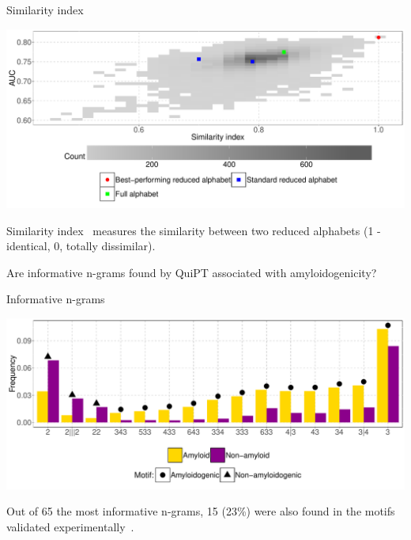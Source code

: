 \documentclass{beamer}\usepackage[]{graphicx}\usepackage[]{color}
\makeatletter
\def\maxwidth{ %
  \ifdim\Gin@nat@width>\linewidth
    \linewidth
  \else
    \Gin@nat@width
  \fi
}
\newenvironment{knitrout}{}{} %
\makeatother
\begin{document}
\begin{frame}{Similarity index}
\begin{knitrout}
\color{fgcolor}

{\centering \includegraphics[width=\maxwidth]{figure/unnamed-chunk-3-1} 

}



\end{knitrout}
Similarity index~\citep{stephenson_unearthing_2013} measures the similarity between two reduced alphabets (1 - identical, 0, totally dissimilar).
\end{frame}

\begin{frame}{}
Are informative n-grams found by QuiPT associated with amyloidogenicity?
\end{frame}


\begin{frame}{Informative n-grams}
\begin{knitrout}
\color{fgcolor}

{\centering \includegraphics[width=\maxwidth]{figure/unnamed-chunk-4-1} 

}



\end{knitrout}

Out of 65 the most informative n-grams, 15 (23\%) were also found in the motifs validated experimentally~\citep{paz_sequence_2004}.
\end{frame}
\end{document}
